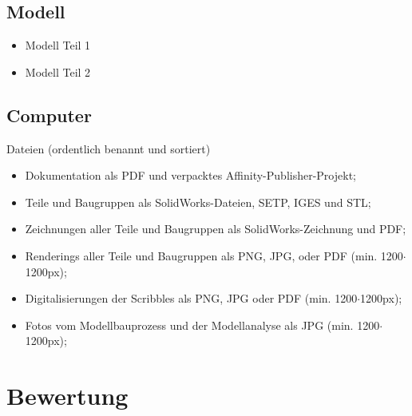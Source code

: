 \documentclass{report}
\begin{document}
\subsection{Modell}
\begin{itemize}
  \item Modell Teil 1
  \item Modell Teil 2
\end{itemize}

\subsection{Computer}
Dateien (ordentlich benannt und sortiert)
\begin{itemize}
  \item Dokumentation als PDF und verpacktes Affinity-Publisher-Projekt;
  \item Teile und Baugruppen als SolidWorks-Dateien, SETP, IGES und STL;
  \item Zeichnungen aller Teile und Baugruppen als SolidWorks-Zeichnung und PDF;
  \item Renderings aller Teile und Baugruppen als PNG, JPG, oder PDF (min. 1200$\cdot$1200px);
  \item Digitalisierungen der Scribbles als PNG, JPG oder PDF (min. 1200$\cdot$1200px);
  \item Fotos vom Modellbauprozess und der Modellanalyse als JPG (min. 1200$\cdot$1200px);
\end{itemize}

\section{Bewertung}
\end{document}
